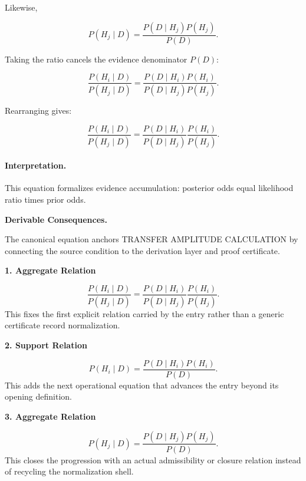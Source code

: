 Likewise,

\begin{equation}
P(H_j\mid D)
=
\frac{P(D\mid H_j)P(H_j)}
{P(D)} .
\end{equation}

Taking the ratio cancels the evidence denominator $P(D)$:

\begin{equation}
\frac{P(H_i\mid D)}
{P(H_j\mid D)}
=
\frac{P(D\mid H_i)P(H_i)}
{P(D\mid H_j)P(H_j)} .
\end{equation}

Rearranging gives:

\begin{equation}
\boxed{
\frac{P(H_i\mid D)}
{P(H_j\mid D)}
=
\frac{P(D\mid H_i)}
{P(D\mid H_j)}
\frac{P(H_i)}
{P(H_j)} .
}
\end{equation}

\paragraph{Interpretation.}
This equation formalizes evidence accumulation: posterior odds equal likelihood ratio times prior odds.

\par\vspace{0.35em}
\noindent\textbf{Derivable Consequences.}\quad
\begingroup
\footnotesize
\raggedright
The canonical equation anchors TRANSFER AMPLITUDE CALCULATION by connecting the source condition to the derivation layer and proof certificate.
\par\endgroup

\noindent\textbf{1. Aggregate Relation}\par
\[
\frac{P(H_i\mid D)} {P(H_j\mid D)} = \frac{P(D\mid H_i)} {P(D\mid H_j)} \frac{P(H_i)} {P(H_j)}.
\]
\noindent This fixes the first explicit relation carried by the entry rather than a generic certificate record normalization.\par
\noindent\textbf{2. Support Relation}\par
\[
P(H_i\mid D) = \frac{P(D\mid H_i)P(H_i)} {P(D)}.
\]
\noindent This adds the next operational equation that advances the entry beyond its opening definition.\par
\noindent\textbf{3. Aggregate Relation}\par
\[
P(H_j\mid D) = \frac{P(D\mid H_j)P(H_j)} {P(D)}.
\]
\noindent This closes the progression with an actual admissibility or closure relation instead of recycling the normalization shell.\par

